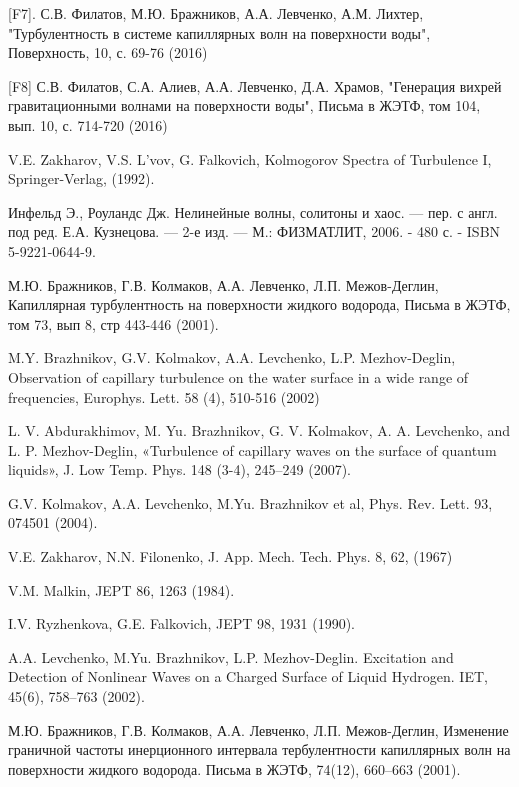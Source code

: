 [F7]. С.В. Филатов, М.Ю. Бражников, А.А. Левченко,  А.М. Лихтер, "Турбулентность в системе капиллярных волн на поверхности воды", Поверхность, 10, с. 69-76 (2016)

[F8] С.В. Филатов, С.А. Алиев, А.А. Левченко, Д.А. Храмов, "Генерация вихрей гравитационными волнами на поверхности воды", Письма в ЖЭТФ, том 104, вып.  10, с. 714-720 (2016)


\begin{thebibliography}{99}

V.E. Zakharov, V.S. L'vov, G. Falkovich, Kolmogorov Spectra of Turbulence I, Springer-Verlag, (1992).

Инфельд Э., Роуландс Дж. Нелинейные волны, солитоны и 
хаос. — пер. с англ. под ред. Е.А. Кузнецова. — 2-е изд. — М.: ФИЗМАТЛИТ, 
2006. - 480 с. - ISBN 5-9221-0644-9. 


М.Ю. Бражников, Г.В. Колмаков, А.А. Левченко, Л.П. Межов-Деглин, Капиллярная турбулентность на поверхности жидкого водорода, Письма в ЖЭТФ, том 73, вып 8, стр 443-446 (2001).

M.Y. Brazhnikov, G.V. Kolmakov, A.A. Levchenko, L.P. Mezhov-Deglin, Observation of capillary turbulence on the water surface in a wide range of frequencies, Europhys. Lett. 58 (4), 510-516 (2002) 

L. V. Abdurakhimov, M. Yu. Brazhnikov, G. V. Kolmakov, A. A. Levchenko, and L. P. Mezhov-Deglin, «Turbulence of capillary waves on the surface of quantum liquids», J. Low Temp. Phys. 148 (3-4), 245--249 (2007). 
 
G.V. Kolmakov, A.A. Levchenko, M.Yu. Brazhnikov et al, Phys. Rev. Lett. 93, 074501 (2004).

V.E. Zakharov, N.N. Filonenko, J. App. Mech. Tech. Phys. 8, 62, (1967)

V.M. Malkin, JEPT 86, 1263 (1984).

I.V. Ryzhenkova, G.E. Falkovich, JEPT 98, 1931 (1990).

A.A. Levchenko, M.Yu. Brazhnikov, L.P. Mezhov-Deglin. Excitation and Detection of Nonlinear Waves on a Charged Surface of Liquid Hydrogen. IET, 45(6), 758–763 (2002).

М.Ю. Бражников, Г.В. Колмаков, А.А. Левченко, Л.П. Межов-Деглин, Изменение граничной частоты инерционного интервала тербулентности капиллярных волн на поверхности жидкого водорода. Письма в ЖЭТФ, 74(12), 660–663 (2001).


\end{thebibliography}
